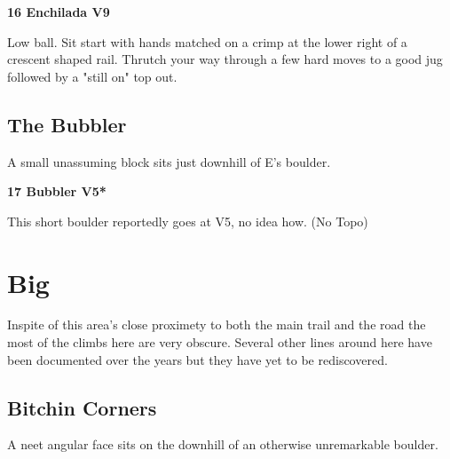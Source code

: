 \begin{multicols}{2}
					\begin{minipage}{\linewidth}	
					\label{rt:Enchilada}
\colorbox{Goldenrod!50}{
\parbox{0.95\textwidth}{
\textbf{
16 Enchilada V9    
}
}
}

					\begin{adjustwidth}{0.5cm}{}				
					Low ball. Sit start with hands matched on a crimp at the lower right of a crescent shaped rail. Thrutch your way through a few hard moves to a good jug followed by a "still on" top out.
					\end{adjustwidth}
					\end{minipage}
			\begin{minipage}{\columnwidth}
			\subsection*{The Bubbler}\label{bf:The Bubbler}
			A small unassuming block sits just downhill of E's boulder.
			
			\end{minipage}
			
					\begin{minipage}{\linewidth}	
					\label{rt:Bubbler}
\colorbox{RoyalBlue!20}{
\parbox{0.95\textwidth}{
\textbf{
17 Bubbler V5*  
}
}
}

					\begin{adjustwidth}{0.5cm}{}				
					This short boulder reportedly goes at V5, no idea how.
						\newline (No Topo) 
					\end{adjustwidth}
					\end{minipage}
\newpage

		\section{Big}\label{sa:Big}
	\begin{minipage}{\columnwidth}
	Inspite of this area's close proximety to both the main trail and the road the most of the climbs here are very obscure. Several other lines around here have been documented over the years but they have yet to be rediscovered.
	\end{minipage}
	
			\begin{minipage}{\columnwidth}
			\subsection*{Bitchin Corners}\label{bf:Bitchin Corners}
			A neet angular face sits on the downhill of an otherwise unremarkable boulder.
			

\end{minipage}
\end{multicols}
